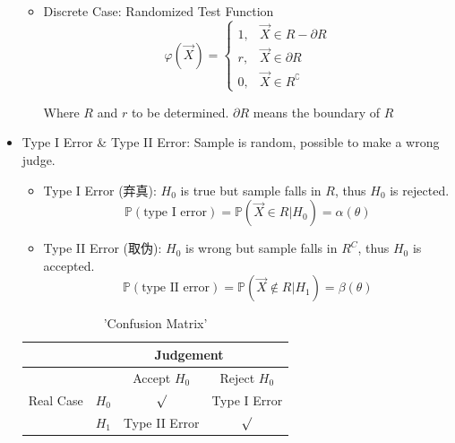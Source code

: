 \begin{itemize}[topsep = -3 pt]
\begin{itemize}
        \item Discrete Case: Randomized Test Function
        \begin{equation}
        \varphi(\vec{X})=\begin{cases}
            1,&\vec{X}\in R-\partial R\\
            r,&\vec{X}\in \partial R\\
            0,&\vec{X}\in R^\complement
        \end{cases}    
        \end{equation}

        Where $R$ and $r$  to be determined. $\partial R$ means the boundary of $ R $
    \end{itemize}
        \item Type I Error \& Type II Error: Sample is random, possible to make a wrong judge.
            
        \begin{itemize}[topsep = -4 pt]
            \item Type I Error (弃真): $H_0$ is true but sample falls in $R$, thus $H_0$ is rejected.
            \begin{equation}\mathbb{P}(\text{type I error})=\mathbb{P}(\vec{X}\in R|H_0)=\alpha(\theta)\end{equation}
            \item Type II Error (取伪): $H_0$ is wrong but sample falls in $R^C$, thus $H_0$ is accepted.
            \begin{equation}\mathbb{P}(\text{type II error})=\mathbb{P}(\vec{X}\notin R|H_1)=\beta(\theta)\end{equation}
        \end{itemize}

    \begin{table}[htbp]
        \centering
        \begin{tabular}{c|ccc}
            \hline
            &\multicolumn{3}{c}{Judgement}\\
            \hline
            \multirow{3}{*}{Real Case}&&Accept $H_0$&Reject $H_0$\\ 
            &$H_0$&$\surd$&Type I Error\\ 
            &$H_1$&Type II Error&$\surd$\\ 
            \hline
        \end{tabular}
        \caption{'Confusion Matrix'}
    \end{table}



\end{itemize}
